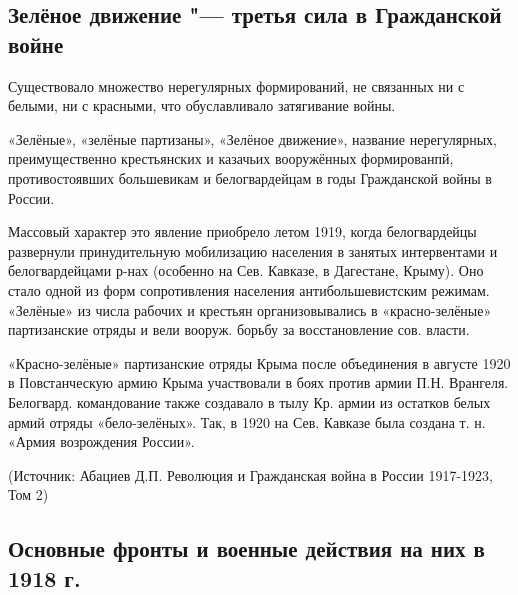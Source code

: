 \subsection{Зелёное движение "--- третья сила в Гражданской войне}

Существовало множество нерегулярных формирований, не связанных ни с белыми, ни с красными, что обуславливало затягивание войны.

«Зелёные», «зелёные партизаны», «Зелёное движение», название нерегулярных, преимущественно крестьянских и казачьих вооружённых формированпй, противостоявших большевикам и белогвардейцам в годы Гражданской войны в России.

Массовый характер это явление приобрело летом 1919, когда белогвардейцы развернули принудительную мобилизацию населения в занятых интервентами и белогвардейцами р-нах (особенно на Сев. Кавказе, в Дагестане, Крыму).
Оно стало одной из форм сопротивления населения антибольшевистским режимам.
«Зелёные» из числа рабочих и крестьян организовывались в «красно-зелёные» партизанские отряды и вели вооруж. борьбу за восстановление сов. власти.

«Красно-зелёные» партизанские отряды Крыма после объединения в августе 1920 в Повстанческую армию Крыма участвовали в боях против армии П.Н. Врангеля.
Белогвард. командование также создавало в тылу Кр. армии из остатков белых армий отряды «бело-зелёных». Так, в 1920 на Сев. Кавказе была создана т. н. «Армия возрождения России».

(Источник: Абациев Д.П. Революция и Гражданская война в России 1917-1923, Том 2)

\subsection{Основные фронты и военные действия на них в 1918 г.}


